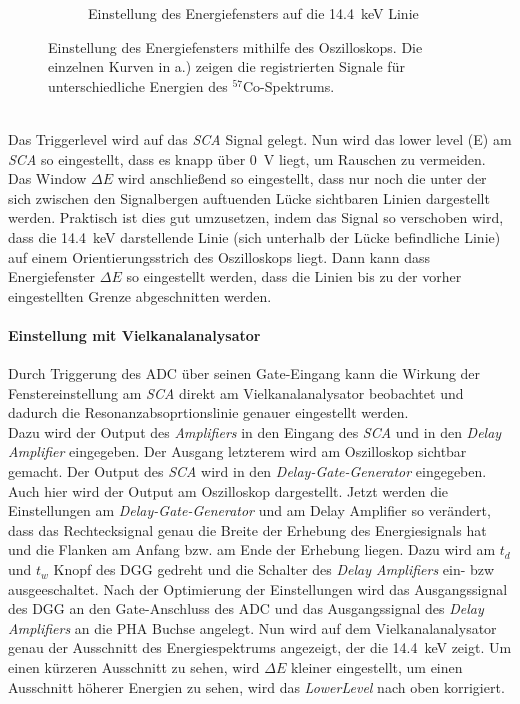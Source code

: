 \documentclass[a4paper,twoside,final]{article}
\begin{document}
\begin{figure}[htp]
\begin{subfigure}{0.45\textwidth}
        \caption{Einstellung des Energiefensters auf die \SI{14,4}{\kilo\electronvolt} Linie}
    \end{subfigure}
    \caption{Einstellung des Energiefensters mithilfe des Oszilloskops. Die einzelnen Kurven in a.) zeigen die registrierten Signale für unterschiedliche Energien des $^{57}$Co-Spektrums.}
    \label{fig:Oszilloskop}
\end{figure}\\
Das Triggerlevel wird auf das \textit{SCA} Signal gelegt. Nun wird das lower level (E) am \textit{SCA} so eingestellt, dass es knapp über \SI{0}{\volt} liegt, um Rauschen zu vermeiden. Das Window $\Delta E$ wird anschließend so eingestellt, dass nur noch die unter der sich zwischen den Signalbergen auftuenden Lücke sichtbaren Linien dargestellt werden. Praktisch ist dies gut umzusetzen, indem das Signal so verschoben wird, dass die \SI{14,4}{\kilo\electronvolt} darstellende Linie (sich unterhalb der Lücke befindliche Linie) auf einem Orientierungsstrich des Oszilloskops liegt. Dann kann dass Energiefenster $\Delta E$ so eingestellt werden, dass die Linien bis zu der vorher eingestellten Grenze abgeschnitten werden.

\paragraph{Einstellung mit Vielkanalanalysator}
Durch Triggerung des ADC über seinen Gate-Eingang kann die Wirkung der Fenstereinstellung am \textit{SCA} direkt am Vielkanalanalysator beobachtet und dadurch die Resonanzabsoprtionslinie genauer eingestellt werden. \\
Dazu wird der Output des \textit{Amplifiers} in den Eingang des \textit{SCA} und in den \textit{Delay Amplifier} eingegeben. Der Ausgang letzterem wird am Oszilloskop sichtbar gemacht. Der Output des \textit{SCA} wird in den \textit{Delay-Gate-Generator} eingegeben.
Auch hier wird der Output am Oszilloskop dargestellt. Jetzt werden die Einstellungen am \textit{Delay-Gate-Generator} und am Delay Amplifier so verändert, dass das Rechtecksignal genau die Breite der Erhebung des Energiesignals hat und die Flanken am Anfang bzw. am Ende der Erhebung liegen. Dazu wird am $t_d$ und $t_w$ Knopf des DGG gedreht und die Schalter des \textit{Delay Amplifiers} ein- bzw ausgeeschaltet. Nach der Optimierung der Einstellungen wird das Ausgangssignal des DGG an den Gate-Anschluss des ADC und das Ausgangssignal des \textit{Delay Amplifiers} an die PHA Buchse angelegt. Nun wird auf dem Vielkanalanalysator genau der Ausschnitt des Energiespektrums angezeigt, der die \SI{14,4}{\kilo\electronvolt} zeigt. Um einen kürzeren Ausschnitt zu sehen, wird $\Delta E$ kleiner eingestellt, um einen Ausschnitt höherer Energien zu sehen, wird das \textit{LowerLevel} nach oben korrigiert. \\
\end{document}
